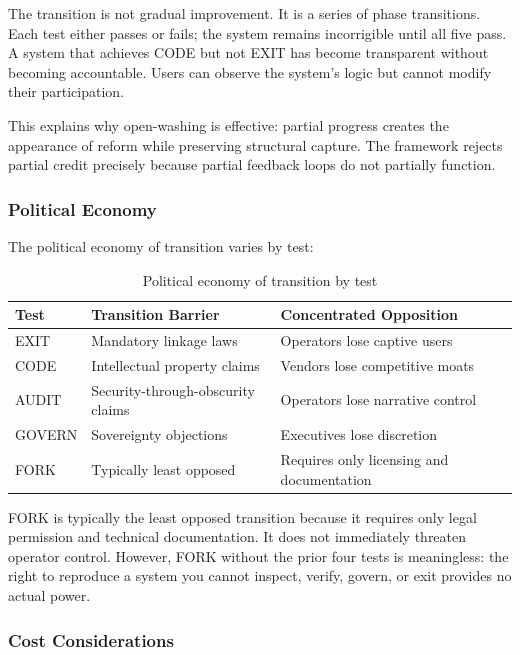 The transition is not gradual improvement. It is a series of phase transitions. Each test either passes or fails; the system remains incorrigible until all five pass. A system that achieves CODE but not EXIT has become transparent without becoming accountable. Users can observe the system's logic but cannot modify their participation.

This explains why open-washing is effective: partial progress creates the appearance of reform while preserving structural capture. The framework rejects partial credit precisely because partial feedback loops do not partially function.

\subsubsection{Political Economy}

The political economy of transition varies by test:

\begin{table}[h]
\centering
\caption{Political economy of transition by test}
\label{tab:political-economy}
\begin{tabular}{lll}
\hline
\textbf{Test} & \textbf{Transition Barrier} & \textbf{Concentrated Opposition} \\
\hline
EXIT & Mandatory linkage laws & Operators lose captive users \\
CODE & Intellectual property claims & Vendors lose competitive moats \\
AUDIT & Security-through-obscurity claims & Operators lose narrative control \\
GOVERN & Sovereignty objections & Executives lose discretion \\
FORK & Typically least opposed & Requires only licensing and documentation \\
\hline
\end{tabular}
\end{table}

FORK is typically the least opposed transition because it requires only legal permission and technical documentation. It does not immediately threaten operator control. However, FORK without the prior four tests is meaningless: the right to reproduce a system you cannot inspect, verify, govern, or exit provides no actual power.

\subsubsection{Cost Considerations}

